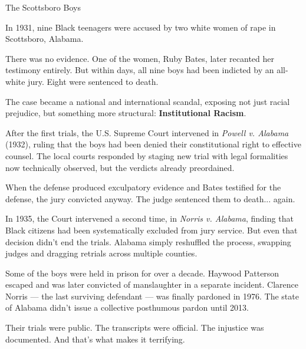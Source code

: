 \medskip

\begin{HistoricalSidebar}{The Scottsboro Boys}

  In 1931, nine Black teenagers were accused by two white women of rape in Scottsboro, Alabama.
  
  \medskip
  
  There was no evidence. One of the women, Ruby Bates, later recanted her testimony entirely.  
  But within days, all nine boys had been indicted by an all-white jury. Eight were sentenced to death.
  
  \medskip
  
  The case became a national and international scandal, exposing not just racial prejudice, but something more structural:  
  \textbf{Institutional Racism}.
  
  \medskip
  
  After the first trials, the U.S. Supreme Court intervened in \textit{Powell v. Alabama} (1932), ruling that the boys 
  had been denied their constitutional right to effective counsel.  
  The local courts responded by staging new trial with legal formalities now technically observed, but the 
  verdicts already preordained.
  
  \medskip
  
  When the defense produced exculpatory evidence and Bates testified for the defense, the jury convicted anyway.  
  The judge sentenced them to death... again.
  
  \medskip
  
  In 1935, the Court intervened a second time, in \textit{Norris v. Alabama}, finding that Black citizens had been 
  systematically excluded from jury service.  
  But even that decision didn’t end the trials. Alabama simply reshuffled the process, swapping judges and dragging 
  retrials across multiple counties.
  
  \medskip
  
  Some of the boys were held in prison for over a decade. Haywood Patterson escaped and was later convicted of 
  manslaughter in a separate incident.  
  Clarence Norris — the last surviving defendant — was finally pardoned in 1976.  
  The state of Alabama didn’t issue a collective posthumous pardon until 2013.
  
  \medskip
  
  Their trials were public. 
  The transcripts were official. 
  The injustice was documented.
  And that’s what makes it terrifying.
  
  \end{HistoricalSidebar}
  

